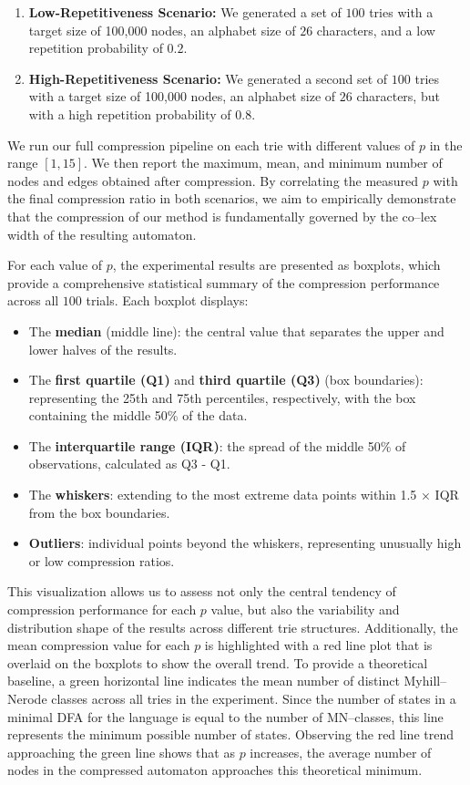 \begin{enumerate}
    \item \textbf{Low-Repetitiveness Scenario:} We generated a set of $100$ tries with a target size of 100,000 nodes, an alphabet size of $26$ characters, and a low repetition probability of $0.2$.
    \item \textbf{High-Repetitiveness Scenario:} We generated a second set of $100$ tries with a target size of 100,000 nodes, an alphabet size of $26$ characters, but with a high repetition probability of $0.8$.
\end{enumerate}

We run our full compression pipeline on each trie with different values of $p$ in the range $[1, 15]$. We then report the maximum, mean, and minimum number of nodes and edges obtained after compression. By correlating the measured $p$ with the final compression ratio in both scenarios, we aim to empirically demonstrate that the compression of our method is fundamentally governed by the co--lex width of the resulting automaton.

For each value of $p$, the experimental results are presented as boxplots, which provide a comprehensive statistical summary of the compression performance across all $100$ trials. Each boxplot displays:
\begin{itemize}
    \item The \textbf{median} (middle line): the central value that separates the upper and lower halves of the results.
    \item The \textbf{first quartile (Q1)} and \textbf{third quartile (Q3)} (box boundaries): representing the 25th and 75th percentiles, respectively, with the box containing the middle 50\% of the data.
    \item The \textbf{interquartile range (IQR)}: the spread of the middle 50\% of observations, calculated as Q3 - Q1.
    \item The \textbf{whiskers}: extending to the most extreme data points within 1.5 × IQR from the box boundaries.
    \item \textbf{Outliers}: individual points beyond the whiskers, representing unusually high or low compression ratios.
\end{itemize}
This visualization allows us to assess not only the central tendency of compression performance for each $p$ value, but also the variability and distribution shape of the results across different trie structures. Additionally, the mean compression value for each $p$ is highlighted with a red line plot that is overlaid on the boxplots to show the overall trend. To provide a theoretical baseline, a green horizontal line indicates the mean number of distinct Myhill--Nerode classes across all tries in the experiment. Since the number of states in a minimal DFA for the language is equal to the number of MN--classes, this line represents the minimum possible number of states. Observing the red line trend approaching the green line shows that as $p$ increases, the average number of nodes in the compressed automaton approaches this theoretical minimum.

